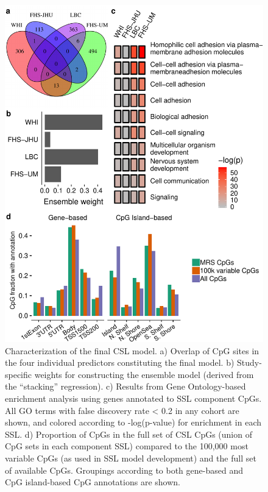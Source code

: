\documentclass[]{article}
\begin{document}
\begin{figure}
\centering
\includegraphics{figures/characterization-1.pdf}
\caption{Characterization of the final CSL model. a) Overlap of CpG
sites in the four individual predictors constituting the final model. b)
Study-specific weights for constructing the ensemble model (derived from
the ``stacking'' regression). c) Results from Gene Ontology-based
enrichment analysis using genes annotated to SSL component CpGs. All GO
terms with false discovery rate \textless{} 0.2 in any cohort are shown,
and colored according to -log(p-value) for enrichment in each SSL. d)
Proportion of CpGs in the full set of CSL CpGs (union of CpG sets in
each component SSL) compared to the 100,000 most variable CpGs (as used
in SSL model development) and the full set of available CpGs. Groupings
according to both gene-based and CpG island-based CpG annotations are
shown.}
\end{figure}
\end{document}
